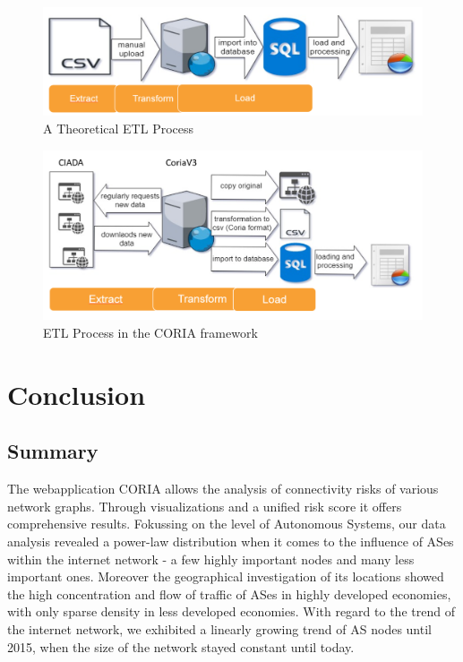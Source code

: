\documentclass[conference, 11pt]{IEEEtran}
\begin{document}
\begin{figure}[htbp]
\centerline{\includegraphics[scale=0.29]{Graphics/ETL1.PNG}}
\caption{A Theoretical ETL Process}
\label{fig}
\end{figure}

\begin{figure}[htbp]
\centerline{\includegraphics[scale=0.4]{Graphics/ETL2.PNG}}
\caption{ETL Process in the CORIA framework}
\label{fig}
\end{figure}


\section{Conclusion}
\subsection{Summary}

The webapplication CORIA allows the analysis of connectivity risks of various network graphs. Through visualizations and a unified risk score it offers comprehensive results. Fokussing on the level of Autonomous Systems, our data analysis revealed a power-law distribution when it comes to the influence of ASes within the internet network - a few highly important nodes and many less important ones. Moreover the geographical investigation of its locations showed the high concentration and flow of traffic of ASes in highly developed economies, with only sparse density in less developed economies. With regard to the trend of the internet network, we exhibited a linearly growing trend of AS nodes until 2015, when the size of the network stayed constant until today.
\end{document}
